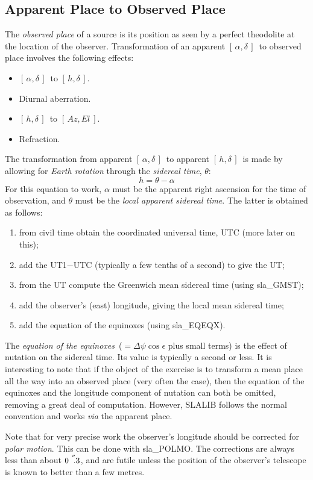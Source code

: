 \documentclass[11pt,twoside,nolof]{starlink}
\providecommand{\radec}     {$[\,\alpha,\delta\,]$}
\providecommand{\hadec}     {$[\,h,\delta\,]$}
\providecommand{\azel}      {$[\,Az,El~]$}
\providecommand{\arcsec}[2] {\arcseci{#1}$\hspace{-0.4em}.#2$}
\providecommand{\arcseci}[1] {$#1\hspace{-0.05em}$\raisebox{-0.5ex}
                         {$^{'\hspace{-0.1em}'}$}}
\begin{document}
\subsection{Apparent Place to Observed Place}
The \textit{observed place}\/ of a source is its position as
seen by a perfect theodolite at the location of the
observer.  Transformation of an apparent \radec\ to observed
place involves the following effects:
\goodbreak
\begin{itemize}
   \item \radec\ to \hadec.
   \item Diurnal aberration.
   \item \hadec\ to \azel.
   \item Refraction.
\end{itemize}
The transformation from apparent \radec\ to
apparent \hadec\ is made by allowing for
\textit{Earth rotation}\/ through the \textit{sidereal time}, $\theta$:
\[ h = \theta - \alpha \]
For this equation to work, $\alpha$ must be the apparent right
ascension for the time of observation, and $\theta$ must be
the \textit{local apparent sidereal time}.  The latter is obtained
as follows:
\begin{enumerate}
\item from civil time obtain the coordinated universal time, UTC
      (more later on this);
\item add the UT1$-$UTC (typically a few tenths of a second) to
      give the UT;
\item from the UT compute the Greenwich mean sidereal time (using
sla\_GMST);
\item add the observer's (east) longitude, giving the local mean
      sidereal time;
\item add the equation of the equinoxes (using
sla\_EQEQX).
\end{enumerate}
The \textit{equation of the equinoxes}\/~($=\Delta\psi\cos\epsilon$ plus
small terms)
is the effect of nutation on the sidereal time.
Its value is typically a second or less.  It is
interesting to note that if the object of the exercise is to
transform a mean place all the way into an observed place (very
often the case),
then the equation of the
equinoxes and the longitude component of nutation can both be
omitted, removing a great deal of computation.  However, SLALIB
follows the normal convention and  works \textit{via}\/ the apparent place.

Note that for very precise work the observer's longitude should
be corrected for \textit{polar motion}.  This can be done with
sla\_POLMO.
The corrections are always less than about \arcsec{0}{3}, and
are futile unless the position of the observer's telescope is known
to better than a few metres.
\end{document}
